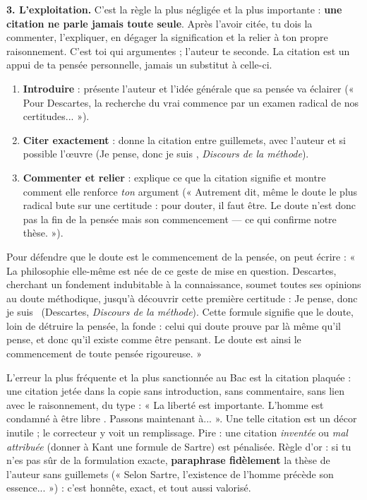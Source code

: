 \documentclass[11pt]{article}
\newcommand{\cle}[1]{{\popxbold\color{popdark}#1}}
\begin{document}
\textbf{3. L'exploitation.} C'est la règle la plus négligée et la plus importante : \textbf{une citation ne parle jamais toute seule}. Après l'avoir citée, tu dois la commenter, l'expliquer, en dégager la signification et la relier à ton propre raisonnement. C'est toi qui argumentes ; l'auteur te seconde. La citation est un appui de ta pensée personnelle, jamais un substitut à celle-ci.

\begin{methode}
\begin{enumerate}
\item \textbf{Introduire} : présente l'auteur et l'idée générale que sa pensée va éclairer (« Pour Descartes, la recherche du vrai commence par un examen radical de nos certitudes... »).
\item \textbf{Citer exactement} : donne la citation entre guillemets, avec l'auteur et si possible l'œuvre (\guillemotleft Je pense, donc je suis \guillemotright, \emph{Discours de la méthode}).
\item \textbf{Commenter et relier} : explique ce que la citation signifie et montre comment elle renforce \emph{ton} argument (« Autrement dit, même le doute le plus radical bute sur une certitude : pour douter, il faut être. Le doute n'est donc pas la fin de la pensée mais son commencement — ce qui confirme notre thèse. »).
\end{enumerate}
\end{methode}

\begin{exemplebox}
Pour défendre que le doute est le commencement de la pensée, on peut écrire : « La philosophie elle-même est née de ce geste de mise en question. Descartes, cherchant un fondement indubitable à la connaissance, soumet toutes ses opinions au doute méthodique, jusqu'à découvrir cette première certitude : \guillemotleft Je pense, donc je suis \guillemotright\ (Descartes, \emph{Discours de la méthode}). Cette formule signifie que le doute, loin de détruire la pensée, la fonde : celui qui doute prouve par là même qu'il pense, et donc qu'il existe comme être pensant. Le doute est ainsi le commencement de toute pensée rigoureuse. »
\end{exemplebox}

\begin{attention}
L'erreur la plus fréquente et la plus sanctionnée au Bac est la \cle{citation plaquée} : une citation jetée dans la copie sans introduction, sans commentaire, sans lien avec le raisonnement, du type : « La liberté est importante. \guillemotleft L'homme est condamné à être libre \guillemotright. Passons maintenant à... ». Une telle citation est un décor inutile ; le correcteur y voit un remplissage. Pire : une citation \emph{inventée} ou \emph{mal attribuée} (donner à Kant une formule de Sartre) est pénalisée. Règle d'or : si tu n'es pas sûr de la formulation exacte, \textbf{paraphrase fidèlement} la thèse de l'auteur sans guillemets (« Selon Sartre, l'existence de l'homme précède son essence... ») : c'est honnête, exact, et tout aussi valorisé.
\end{attention}
\end{document}
